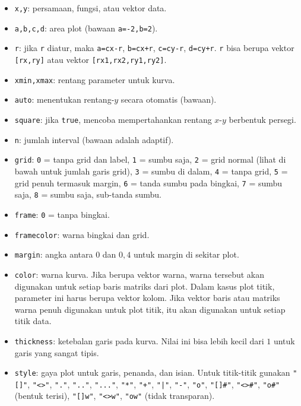 \documentclass[a4paper,11pt,oneside]{scrbook}
\newenvironment{eulernotebook}{}{}
\newenvironment{eulercomment}{\par\medskip\noindent}{\par\medskip}
\begin{document}
\begin{eulernotebook}
\begin{eulercomment}
\begin{itemize}
    \item \texttt{x,y}: persamaan, fungsi, atau vektor data.
    \item \texttt{a,b,c,d}: area plot (bawaan \texttt{a=-2,b=2}).
    \item \texttt{r}: jika \texttt{r} diatur, maka \texttt{a=cx-r}, \texttt{b=cx+r}, \texttt{c=cy-r}, \texttt{d=cy+r}. \texttt{r} bisa berupa vektor \texttt{[rx,ry]} atau vektor \texttt{[rx1,rx2,ry1,ry2]}.
    \item \texttt{xmin,xmax}: rentang parameter untuk kurva.
    \item \texttt{auto}: menentukan rentang-$y$ secara otomatis (bawaan).
    \item \texttt{square}: jika \texttt{true}, mencoba mempertahankan rentang $x$-$y$ berbentuk persegi.
    \item \texttt{n}: jumlah interval (bawaan adalah adaptif).
    \item \texttt{grid}:
    \texttt{0} = tanpa grid dan label,
    \texttt{1} = sumbu saja,
    \texttt{2} = grid normal (lihat di bawah untuk jumlah garis grid),
    \texttt{3} = sumbu di dalam,
    \texttt{4} = tanpa grid,
    \texttt{5} = grid penuh termasuk margin,
    \texttt{6} = tanda sumbu pada bingkai,
    \texttt{7} = sumbu saja,
    \texttt{8} = sumbu saja, sub-tanda sumbu.
    \item \texttt{frame}: \texttt{0} = tanpa bingkai.
    \item \texttt{framecolor}: warna bingkai dan grid.
    \item \texttt{margin}: angka antara $0$ dan $0{,}4$ untuk margin di sekitar plot.
    \item \texttt{color}: warna kurva. Jika berupa vektor warna, warna tersebut akan digunakan untuk setiap baris matriks dari plot. Dalam kasus plot titik, parameter ini harus berupa vektor kolom. Jika vektor baris atau matriks warna penuh digunakan untuk plot titik, itu akan digunakan untuk setiap titik data.
    \item \texttt{thickness}: ketebalan garis pada kurva. Nilai ini bisa lebih kecil dari $1$ untuk garis yang sangat tipis.
    \item \texttt{style}: gaya plot untuk garis, penanda, dan isian.
    Untuk titik-titik gunakan \texttt{"[]"}, \texttt{"<>"}, \texttt{"."}, \texttt{".."}, \texttt{"..."}, \texttt{"*"}, \texttt{"+"}, \texttt{"|"}, \texttt{"-"}, \texttt{"o"}, \texttt{"[]\#"}, \texttt{"<>\#"}, \texttt{"o\#"} (bentuk terisi), \texttt{"[]w"}, \texttt{"<>w"}, \texttt{"ow"} (tidak transparan).

\end{itemize}
\end{eulercomment}
\end{eulernotebook}
\end{document}
